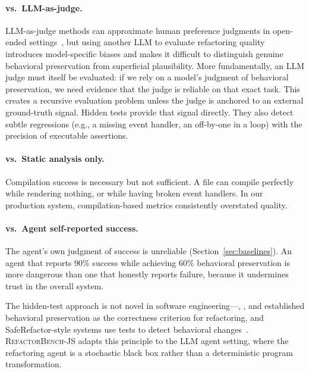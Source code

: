 \documentclass[11pt,letterpaper]{article}
\begin{document}
\paragraph{vs.\ LLM-as-judge.} LLM-as-judge methods can approximate human preference judgments in open-ended settings~\citep{zheng2023judging}, but using another LLM to evaluate refactoring quality introduces model-specific biases and makes it difficult to distinguish genuine behavioral preservation from superficial plausibility. More fundamentally, an LLM judge must itself be evaluated: if we rely on a model's judgment of behavioral preservation, we need evidence that the judge is reliable on that exact task. This creates a recursive evaluation problem unless the judge is anchored to an external ground-truth signal. Hidden tests provide that signal directly. They also detect subtle regressions (e.g., a missing event handler, an off-by-one in a loop) with the precision of executable assertions.

\paragraph{vs.\ Static analysis only.} Compilation success is necessary but not sufficient. A file can compile perfectly while rendering nothing, or while having broken event handlers. In our production system, compilation-based metrics consistently overstated quality.

\paragraph{vs.\ Agent self-reported success.} The agent's own judgment of success is unreliable (Section~\ref{sec:baselines}). An agent that reports 90\% success while achieving 60\% behavioral preservation is more dangerous than one that honestly reports failure, because it undermines trust in the overall system.

The hidden-test approach is not novel in software engineering---\citet{opdyke1992refactoring}, \citet{griswold1993automated}, and \citet{fowler1999refactoring} established behavioral preservation as the correctness criterion for refactoring, and SafeRefactor-style systems use tests to detect behavioral changes~\citep{soares2013automated}. \textsc{RefactorBench}-JS adapts this principle to the LLM agent setting, where the refactoring agent is a stochastic black box rather than a deterministic program transformation.

\end{document}

